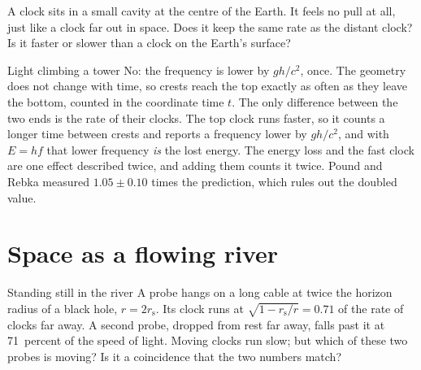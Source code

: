 \begin{checkpoint}[label=chk:earth-centre]
A clock sits in a small cavity at the centre of the Earth. It feels no pull at
all, just like a clock far out in space. Does it keep the same rate as the
distant clock? Is it faster or slower than a clock on the Earth's surface?
\end{checkpoint}

\begin{revisited}{Light climbing a tower}
No: the frequency is lower by $gh/c^{2}$, once. The geometry does not change
with time, so crests reach the top exactly as often as they leave the bottom,
counted in the coordinate time $t$. The only difference between the two ends
is the rate of their clocks. The top clock runs faster, so it counts a longer
time between crests and reports a frequency lower by $gh/c^{2}$, and with
$E = hf$ that lower frequency \emph{is} the lost energy. The energy loss and
the fast clock are one effect described twice, and adding them counts it
twice. Pound and Rebka measured $1.05 \pm 0.10$ times the prediction, which
rules out the doubled value.
\end{revisited}

\section{Space as a flowing river}\label{sec:river}

\begin{thought}{Standing still in the river}
A probe hangs on a long cable at twice the horizon radius of a black hole,
$r = 2r_{\mathrm{s}}$. Its clock runs at $\sqrt{1 - r_{\mathrm{s}}/r} = 0.71$ of
the rate of clocks far away. A second probe, dropped from rest far away, falls
past it at 71~percent of the speed of light. Moving clocks run slow; but which
of these two probes is moving? Is it a coincidence that the two numbers match?
\end{thought}

